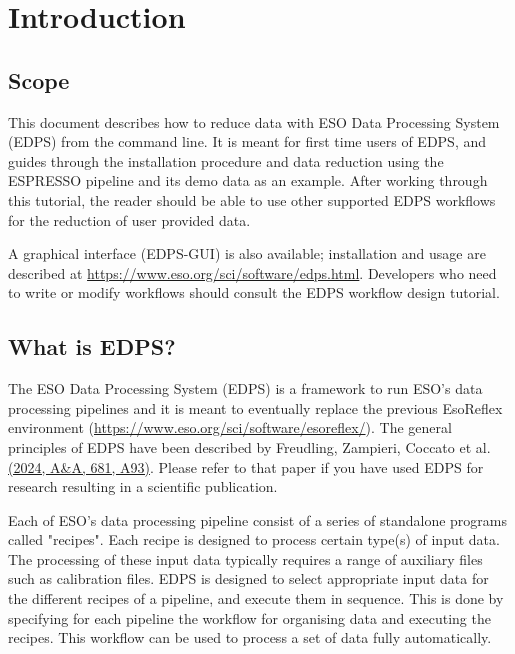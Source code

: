 \section{Introduction}
\subsection{Scope}

This document describes how to reduce data with ESO Data Processing System (EDPS) from the command line. It is meant for first time users of EDPS, and guides through the installation procedure and data reduction using the ESPRESSO pipeline and its demo data as an example. After working through this tutorial, the reader should be able to use other supported EDPS workflows for the reduction of user provided data.

A graphical interface (EDPS-GUI) is also available; installation and usage are described at \url{https://www.eso.org/sci/software/edps.html}. Developers who need to write or modify workflows should consult the EDPS workflow design tutorial.

\subsection{What is EDPS?}

The ESO Data Processing System (EDPS) is a framework  to  run ESO's data processing pipelines and it is meant to eventually replace the previous EsoReflex environment (\url{https://www.eso.org/sci/software/esoreflex/}). The general principles of EDPS have been described by Freudling, Zampieri, Coccato et al. \href{https://www.aanda.org/articles/aa/full_html/2024/01/aa47651-23/aa47651-23.html}{(2024, A\&A, 681, A93)}. Please refer to that paper if you have used EDPS for research resulting in a scientific publication. 

Each of ESO's data processing pipeline consist of a series of standalone programs called "recipes". Each recipe is designed to process certain type(s) of input data. The processing 
of these input data typically requires a range of auxiliary files such as calibration files. EDPS 
is designed to select appropriate input data for the different recipes of a pipeline, and execute 
them in sequence. This is done by specifying for each pipeline the workflow for organising data
and executing the recipes. This workflow can be used to process a set of data fully automatically. 



